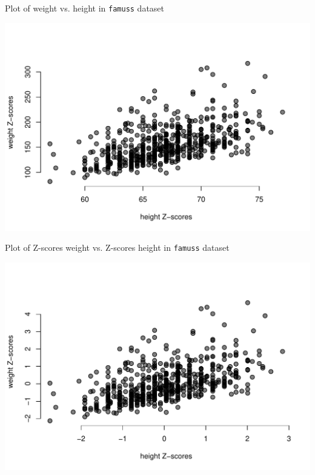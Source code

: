 \documentclass[10pt]{beamer}\usepackage[]{graphicx}\usepackage[]{color}
\makeatletter
\def\maxwidth{ %
  \ifdim\Gin@nat@width>\linewidth
    \linewidth
  \else
    \Gin@nat@width
  \fi
}
\newenvironment{knitrout}{}{} %
\makeatother
\begin{document}
\begin{frame}[fragile]{Plot of weight vs. height in \texttt{famuss} dataset}
	
\begin{knitrout}\tiny
{}\color{fgcolor}

{\centering \includegraphics[width=\maxwidth]{figure/unnamed-chunk-1-1} 

}


\end{knitrout}
	
\end{frame}


\begin{frame}[fragile]{Plot of Z-scores weight vs. Z-scores height in \texttt{famuss} dataset}

\begin{knitrout}\tiny
{}\color{fgcolor}

{\centering \includegraphics[width=\maxwidth]{figure/unnamed-chunk-2-1} 

}


\end{knitrout}

\end{frame}
\end{document}
